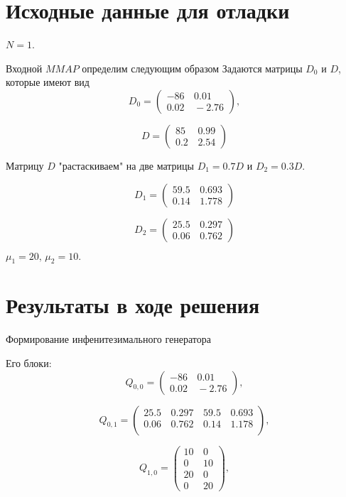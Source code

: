 \documentclass[12pt, a4paper]{article}
\begin{document}
\section{Исходные данные для отладки}

$N=1$.

Входной $MMAP$ определим следующим образом
Задаются  матрицы $D_0$ и $D$, которые  имеют вид
 $$
    D_0 = \left(\begin{array}{cc}
     -86 & \,0.01 \\
     0.02 & \,-2.76
    \end{array}\right),
   $$

    $$
    D = \left(\begin{array}{cc}
     85 & \,0.99 \\
     0.2 & \,2.54
\end{array}\right)
$$

Матрицу $D$ "растаскиваем"  на две матрицы $D_1 = 0.7 D$ и $D_2 =0.3 D.$

    $$
D_1 = \left(\begin{array}{cc}
59.5 & \,0.693 \\
0.14 & \,1.778
\end{array}\right)
$$

    $$
D_2 = \left(\begin{array}{cc}
25.5 & \,0.297 \\
0.06 & \,0.762
\end{array}\right)
$$

$\mu_1=20,\, \mu_2=10.$


\section{Результаты в ходе решения}

Формирование инфенитезимального генератора

Его блоки:
    $$
Q_{0,0} = \left(\begin{array}{cc}
     -86 & \,0.01 \\
0.02 & \,-2.76
\end{array}\right),
$$


$$
Q_{0,1} = \left(\begin{array}{cccc}
25.5 & \,0.297 & \,59.5 & \,0.693  \\
0.06 & \,0.762 & \,0.14 & \,1.178  \\
\end{array}\right),
$$

    $$
Q_{1,0} = \left(\begin{array}{cc}
10 & \,0 \\
0 & \,10 \\
20 & \,0 \\
0 & \,20
\end{array}\right),
$$
\end{document}
